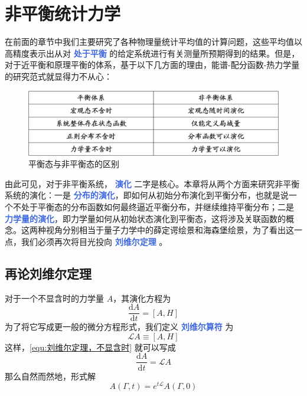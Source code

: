 \chapter{非平衡统计力学}

在前面的章节中我们主要研究了各种物理量统计平均值的计算问题，这些平均值以高精度表示出从对 \textcolor{RoyalBlue}{\textbf{\kaishu 处于平衡}} 的给定系统进行有关测量所预期得到的结果。但是，对于近平衡和原理平衡的体系，基于以下几方面的理由，能谱-配分函数-热力学量的研究范式就显得力不从心：

\begin{figure}[ht]
    \centering
    \includegraphics[width=1\textwidth]{figures/equ-nonequ.png}
    \caption{\kaishu 平衡态与非平衡态的区别}
    \label{fig:equ-nonequ}
\end{figure}

由此可见，对于非平衡系统， \textcolor{RoyalBlue}{\textbf{\kaishu 演化}} 二字是核心。本章将从两个方面来研究非平衡系统的演化：一是 \textcolor{RoyalBlue}{\textbf{\kaishu 分布的演化}}，即如何从初始分布演化到平衡分布，也就是说一个不处于平衡态的分布函数如何最终逼近平衡分布，并继续维持平衡分布；二是 \textcolor{RoyalBlue}{\textbf{\kaishu 力学量的演化}}，即力学量如何从初始状态演化到平衡态，这将涉及关联函数的概念。这两种视角分别相当于量子力学中的薛定谔绘景和海森堡绘景，为了看出这一点，我们必须再次将目光投向 \textcolor{RoyalBlue}{\textbf{\kaishu 刘维尔定理}} 。

\section{再论刘维尔定理}\label{sec:再论刘维尔定理}

对于一个不显含时的力学量 $A$，其演化方程为
\begin{equation}\label{equ:刘维尔定理，不显含时}
    \frac{\mathrm{d} A}{\mathrm{d} t} =  [A, H]
\end{equation}
为了将它写成更一般的微分方程形式，我们定义 \textcolor{RoyalBlue}{\textbf{\kaishu 刘维尔算符}} 为
\begin{equation}\label{equ:刘维尔算符}
    \mathcal{L}A \equiv [A, H]
\end{equation}
这样，\eqref{equ:刘维尔定理，不显含时} 就可以写成
\begin{equation}\label{equ:刘维尔定理，不显含时，微分方程形式}
    \frac{\mathrm{d} A}{\mathrm{d} t} =  \mathcal{L}A
\end{equation}
那么自然而然地，形式解
\begin{equation}\label{equ:形式解}
    A(\Gamma,t) = e^{t\mathcal{L}}A(\Gamma,0)
\end{equation}


